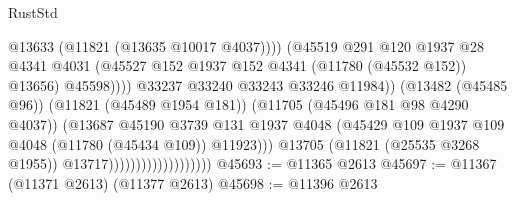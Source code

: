 \begin{lexlean}{RustStd}
\begin{coremodule}
                                                          @13633
                                                          (@11821 (@13635 @10017 @4037))))
                                                      (@45519
                                                        @291
                                                        @120
                                                        @1937
                                                        @28
                                                        @4341
                                                        @4031
                                                        (@45527
                                                          @152
                                                          @1937
                                                          @152
                                                          @4341
                                                          (@11780 (@45532 @152))
                                                          @13656)
                                                        @45598))))
                                                @33237
                                                @33240
                                                @33243
                                                @33246
                                                @11984))
                                            (@13482 (@45485 @96))
                                            (@11821 (@45489 @1954 @181))
                                            (@11705 (@45496 @181 @98 @4290 @4037))
                                            (@13687
                                              @45190
                                              @3739
                                              @131
                                              @1937
                                              @4048
                                              (@45429
                                                @109
                                                @1937
                                                @109
                                                @4048
                                                (@11780 (@45434 @109))
                                                @11923)))
                                          @13705
                                          (@11821 (@25535 @3268 @1955))
                                          @13717)))))))))))))))))))
@45693 := @11365 @2613
@45697 := @11367 (@11371 @2613) (@11377 @2613)
@45698 := @11396 @2613

\end{coremodule}
\end{lexlean}
